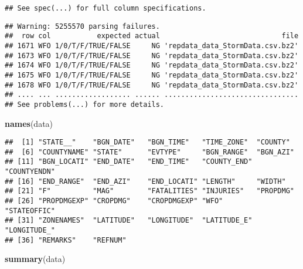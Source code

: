 \documentclass[]{article}
\newenvironment{Shaded}{\begin{snugshade}}{\end{snugshade}}
\newcommand{\KeywordTok}[1]{\textcolor[rgb]{0.13,0.29,0.53}{\textbf{#1}}}
\newcommand{\NormalTok}[1]{#1}
\begin{document}
\begin{verbatim}
## See spec(...) for full column specifications.
\end{verbatim}

\begin{verbatim}
## Warning: 5255570 parsing failures.
##  row col           expected actual                             file
## 1671 WFO 1/0/T/F/TRUE/FALSE     NG 'repdata_data_StormData.csv.bz2'
## 1673 WFO 1/0/T/F/TRUE/FALSE     NG 'repdata_data_StormData.csv.bz2'
## 1674 WFO 1/0/T/F/TRUE/FALSE     NG 'repdata_data_StormData.csv.bz2'
## 1675 WFO 1/0/T/F/TRUE/FALSE     NG 'repdata_data_StormData.csv.bz2'
## 1678 WFO 1/0/T/F/TRUE/FALSE     NG 'repdata_data_StormData.csv.bz2'
## .... ... .................. ...... ................................
## See problems(...) for more details.
\end{verbatim}

\begin{Shaded}
\begin{Highlighting}[]
\KeywordTok{names}\NormalTok{(data)}
\end{Highlighting}
\end{Shaded}

\begin{verbatim}
##  [1] "STATE__"    "BGN_DATE"   "BGN_TIME"   "TIME_ZONE"  "COUNTY"    
##  [6] "COUNTYNAME" "STATE"      "EVTYPE"     "BGN_RANGE"  "BGN_AZI"   
## [11] "BGN_LOCATI" "END_DATE"   "END_TIME"   "COUNTY_END" "COUNTYENDN"
## [16] "END_RANGE"  "END_AZI"    "END_LOCATI" "LENGTH"     "WIDTH"     
## [21] "F"          "MAG"        "FATALITIES" "INJURIES"   "PROPDMG"   
## [26] "PROPDMGEXP" "CROPDMG"    "CROPDMGEXP" "WFO"        "STATEOFFIC"
## [31] "ZONENAMES"  "LATITUDE"   "LONGITUDE"  "LATITUDE_E" "LONGITUDE_"
## [36] "REMARKS"    "REFNUM"
\end{verbatim}

\begin{Shaded}
\begin{Highlighting}[]
\KeywordTok{summary}\NormalTok{(data)}
\end{Highlighting}
\end{Shaded}
\end{document}
